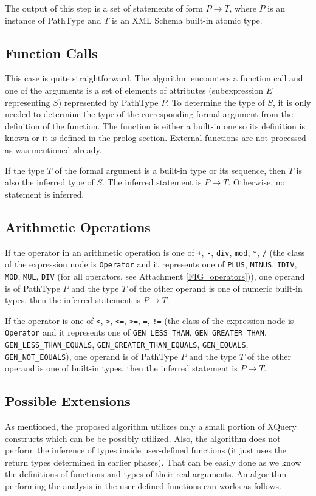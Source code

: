 The output of this step is a set of statements of form $P \rightarrow T$, where $P$ is an instance of PathType and $T$ is an XML Schema built-in atomic type.

\subsection{Function Calls}
This case is quite straightforward. The algorithm encounters a function call and one of the arguments is a set of elements of attributes (subexpression $E$ representing $S$) represented by PathType $P$. To determine the type of $S$, it is only needed to determine the type of the corresponding formal argument from the definition of the function. The function is either a built-in one so its definition is known or it is defined in the prolog section. External functions are not processed as was mentioned already.

If the type $T$ of the formal argument is a built-in type or its sequence, then $T$ is also the inferred type of $S$. The inferred statement is $P \rightarrow T$. Otherwise, no statement is inferred.

\subsection{Arithmetic Operations}
If the operator in an arithmetic operation is one of \texttt{+}, \texttt{-}, \texttt{div}, \texttt{mod}, \texttt{*}, \texttt{/} (the class of the expression node is \texttt{Operator} and it represents one of \texttt{PLUS}, \texttt{MINUS}, \texttt{IDIV}, \texttt{MOD}, \texttt{MUL}, \texttt{DIV} (for all operators, see Attachment \ref{FIG_operators})), one operand is of PathType $P$ and the type $T$ of the other operand is one of numeric built-in types, then the inferred statement is $P \rightarrow T$.

If the operator is one of \texttt{<}, \texttt{>}, \texttt{<=}, \texttt{>=}, \texttt{=}, \texttt{!=} (the class of the expression node is \texttt{Operator} and it represents one of \texttt{GEN\_LESS\_THAN}, \texttt{GEN\_GREATER\_THAN}, \texttt{GEN\_LESS\_THAN\_EQUALS}, \texttt{GEN\_GREATER\_THAN\_EQUALS}, \texttt{GEN\_EQUALS}, \\ \texttt{GEN\_NOT\_EQUALS}), one operand is of PathType $P$ and the type $T$ of the other operand is one of built-in types, then the inferred statement is $P \rightarrow T$.

\subsection{Possible Extensions}
As mentioned, the proposed algorithm utilizes only a small portion of XQuery constructs which can be be possibly utilized. Also, the algorithm does not perform the inference of types inside user-defined functions (it just uses the return types determined in earlier phases). That can be easily done as we know the definitions of functions and types of their real arguments. An algorithm performing the analysis in the user-defined functions can works as follows.

